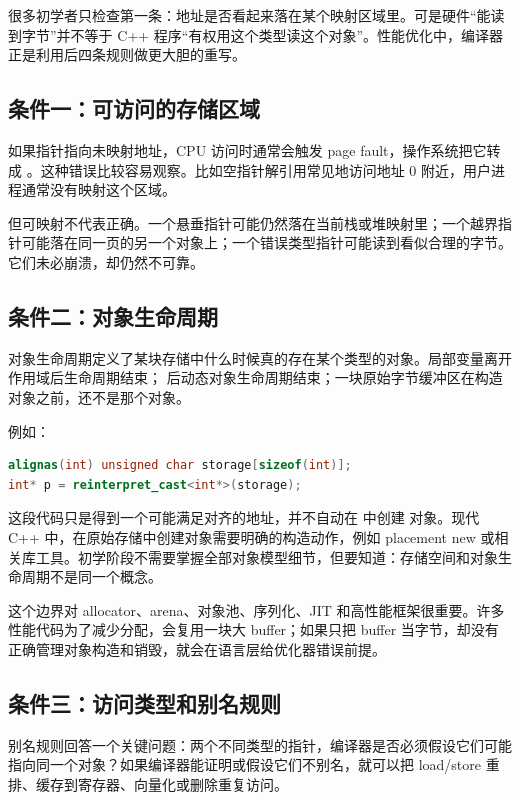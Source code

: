 很多初学者只检查第一条：地址是否看起来落在某个映射区域里。可是硬件“能读到字节”并不等于 C++ 程序“有权用这个类型读这个对象”。性能优化中，编译器正是利用后四条规则做更大胆的重写。

\subsection{条件一：可访问的存储区域}

如果指针指向未映射地址，CPU 访问时通常会触发 page fault，操作系统把它转成 。这种错误比较容易观察。比如空指针解引用常见地访问地址 0 附近，用户进程通常没有映射这个区域。

但可映射不代表正确。一个悬垂指针可能仍然落在当前栈或堆映射里；一个越界指针可能落在同一页的另一个对象上；一个错误类型指针可能读到看似合理的字节。它们未必崩溃，却仍然不可靠。

\subsection{条件二：对象生命周期}

对象生命周期定义了某块存储中什么时候真的存在某个类型的对象。局部变量离开作用域后生命周期结束； 后动态对象生命周期结束；一块原始字节缓冲区在构造对象之前，还不是那个对象。

例如：

\begin{lstlisting}[language=C++]
alignas(int) unsigned char storage[sizeof(int)];
int* p = reinterpret_cast<int*>(storage);
\end{lstlisting}

这段代码只是得到一个可能满足对齐的地址，并不自动在  中创建  对象。现代 C++ 中，在原始存储中创建对象需要明确的构造动作，例如 placement new 或相关库工具。初学阶段不需要掌握全部对象模型细节，但要知道：存储空间和对象生命周期不是同一个概念。

这个边界对 allocator、arena、对象池、序列化、JIT 和高性能框架很重要。许多性能代码为了减少分配，会复用一块大 buffer；如果只把 buffer 当字节，却没有正确管理对象构造和销毁，就会在语言层给优化器错误前提。

\subsection{条件三：访问类型和别名规则}

别名规则回答一个关键问题：两个不同类型的指针，编译器是否必须假设它们可能指向同一个对象？如果编译器能证明或假设它们不别名，就可以把 load/store 重排、缓存到寄存器、向量化或删除重复访问。

